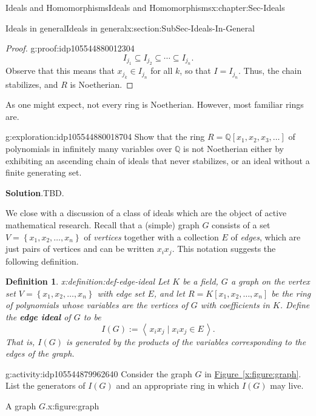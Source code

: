 \documentclass[oneside,10pt,]{book}
\newcommand{\blocktitlefont}{\relax}
\newcommand{\xreffont}{\relax}
\newcommand{\terminology}[1]{\textbf{#1}}
\numberwithin{equation}{section}
\newcommand{\ideal}[1]{\left\langle\, #1 \,\right\rangle}
\newcommand{\set}[1]{\left\{ {#1} \right\}}
\def\Q{{\mathbb Q}}
\newtheorem{definition}[theorem]{Definition}
\begin{document}
\begin{chapterptx}{Ideals and Homomorphisms}{}{Ideals and Homomorphisms}{}{}{x:chapter:Sec-Ideals}
\begin{sectionptx}{Ideals in general}{}{Ideals in general}{}{}{x:section:SubSec-Ideals-In-General}
\begin{proof}{}{g:proof:idp105544880012304}
\begin{equation*}
I_{j_1} \subseteq I_{j_2}\subseteq \cdots \subseteq I_{j_n}.
\end{equation*}
Observe that this means that \(x_{j_k}\in I_{j_n}\) for all \(k\), so that \(I = I_{j_n}\). Thus, the chain stabilizes, and \(R\) is Noetherian.%
\end{proof}
As one might expect, not every ring is Noetherian. However, most familiar rings are.%
\begin{exploration}{}{g:exploration:idp105544880018704}%
Show that the ring \(R = \Q[x_1, x_2, x_3, \ldots]\) of polynomials in infinitely many variables over \(\Q\) is not Noetherian either by exhibiting an ascending chain of ideals that never stabilizes, or an ideal without a finite generating set.%
\par\smallskip%
\noindent\textbf{\blocktitlefont Solution}.\hypertarget{g:solution:idp105544879954704}{}\quad{}TBD.%
\end{exploration}%
We close with a discussion of a class of ideals which are the object of active mathematical research. Recall that a (simple) graph \(G\) consists of a set \(V = \set{x_1, x_2, \ldots, x_n}\) of \emph{vertices} together with a collection \(E\) of \emph{edges}, which are just pairs of vertices and can be written \(x_i x_j\). This notation suggests the following definition.%
\begin{definition}{}{x:definition:def-edge-ideal}%
Let \(K\) be a field, \(G\) a graph on the vertex set \(V = \set{x_1, x_2, \ldots, x_n}\) with edge set \(E\), and let \(R = K[x_1, x_2, \ldots, x_n]\) be the ring of polynomials whose variables are the vertices of \(G\) with coefficients in \(K\). Define the \terminology{edge ideal} of \(G\) to be%
\begin{equation*}
I(G) := \ideal{x_i x_j \mid x_i x_j\in E}.
\end{equation*}
That is, \(I(G)\) is generated by the products of the variables corresponding to the edges of the graph.%
\end{definition}
\begin{activity}{}{g:activity:idp105544879962640}%
Consider the graph \(G\) in \hyperref[x:figure:graph]{Figure~{\xreffont\ref{x:figure:graph}}}. List the generators of \(I(G)\) and an appropriate ring in which \(I(G)\) may live.%
\end{activity}%
\begin{figureptx}{A graph \(G\).}{x:figure:graph}{}%
\begin{image}{0.25}{0.5}{0.25}%

\end{image}
\end{figureptx}
\end{sectionptx}
\end{chapterptx}
\end{document}
